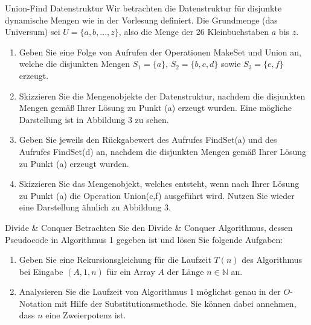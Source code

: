 \documentclass{article}
\begin{document}
\begin{exercise}{Union-Find Datenstruktur}
  Wir betrachten die Datenstruktur für disjunkte dynamische Mengen wie in der Vorlesung definiert. Die Grundmenge (das Universum) sei $U = \{a, b, . . . , z\}$, also die Menge der 26 Kleinbuchstaben $a$ bis $z$.
  \begin{enumerate}
    \item Geben Sie eine Folge von Aufrufen der Operationen MakeSet und Union an, welche die disjunkten Mengen $S_1 = \{a\}$, $S_2 = \{b, c, d\}$ sowie $S_3 = \{e, f\}$ erzeugt.
    \item Skizzieren Sie die Mengenobjekte der Datenstruktur, nachdem die disjunkten Mengen gemäß Ihrer Lösung zu Punkt (a) erzeugt wurden. Eine mögliche Darstellung ist in Abbildung 3 zu sehen.
    \item Geben Sie jeweils den Rückgabewert des Aufrufes FindSet(a) und des Aufrufes FindSet(d) an, nachdem die disjunkten Mengen gemäß Ihrer Lösung zu Punkt (a) erzeugt wurden.
    \item Skizzieren Sie das Mengenobjekt, welches entsteht, wenn nach Ihrer Lösung zu Punkt (a) die Operation Union(c,f) ausgeführt wird. Nutzen Sie wieder eine Darstellung ähnlich zu Abbildung 3.
  \end{enumerate}
  

  \begin{solution}

  \end{solution}
\end{exercise}

\begin{exercise}{Divide \& Conquer}
  Betrachten Sie den Divide \& Conquer Algorithmus, dessen Pseudocode in Algorithmus 1 gegeben ist und lösen Sie folgende Aufgaben:
  \begin{enumerate}
    \item Geben Sie eine Rekursionsgleichung für die Laufzeit $T(n)$ des Algorithmus bei Eingabe $(A, 1, n)$ für ein Array $A$ der Länge $n \in \mathbb{N}$ an.
    \item Analysieren Sie die Laufzeit von Algorithmus 1 möglichst genau in der $O$-Notation mit Hilfe der Substitutionsmethode. Sie können dabei annehmen, dass $n$ eine Zweierpotenz ist.
  \end{enumerate}
  

  \begin{solution}

  \end{solution}
\end{exercise}
\end{document}
